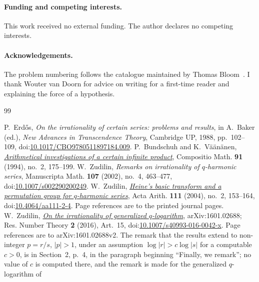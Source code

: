 \documentclass[11pt]{article}
\begin{document}
\paragraph{Funding and competing interests.}
This work received no external funding. The author declares no
competing interests.

\paragraph{Acknowledgements.}
The problem numbering follows the catalogue maintained by Thomas
Bloom~\cite{erdosproblems}. I thank Wouter van Doorn for advice on
writing for a first-time reader and explaining the force of a
hypothesis.

\begin{thebibliography}{99}
\small
\raggedright
\setlength{\itemsep}{2pt}
 P.~Erd\H{o}s, \emph{On the irrationality of certain series:
  problems and results}, in A.~Baker (ed.), \emph{New Advances in Transcendence
  Theory}, Cambridge UP, 1988, pp.~102--109,
  doi:\href{https://doi.org/10.1017/CBO9780511897184.009}{10.1017/CBO9780511897184.009}.
 P.~Bundschuh and K.~V\"a\"an\"anen,
  \href{https://numdam.org/item/CM_1994__91_2_175_0.pdf}{\emph{Arithmetical
  investigations of a certain infinite product}},
  Compositio Math. \textbf{91} (1994), no.~2, 175--199.
 W.~Zudilin, \emph{Remarks on irrationality of
  \(q\)-harmonic series}, Manuscripta Math. \textbf{107} (2002), no.~4,
  463--477,
  doi:\href{https://doi.org/10.1007/s002290200249}{10.1007/s002290200249}.
 W.~Zudilin,
  \href{https://geodesic.mathdoc.fr/articles/10.4064/aa111-2-4/}{\emph{Heine's
  basic transform and a permutation group for \(q\)-harmonic series}},
  Acta Arith. \textbf{111} (2004), no.~2, 153--164,
  doi:\href{https://doi.org/10.4064/aa111-2-4}{10.4064/aa111-2-4}.
  Page references are to the printed journal pages.
 W.~Zudilin,
  \href{https://arxiv.org/abs/1601.02688v2}{\emph{On the irrationality of
  generalized \(q\)-logarithm}}, arXiv:1601.02688; Res. Number Theory
  \textbf{2} (2016), Art.~15,
  doi:\href{https://doi.org/10.1007/s40993-016-0042-x}{10.1007/s40993-016-0042-x}.
  Page references are to arXiv:1601.02688v2.
  The remark that the results extend to non-integer \(p=r/s\), \(|p|>1\), under
  an assumption \(\log|r|>c\log|s|\) for a computable \(c>0\), is in Section~2,
  p.~4, in the paragraph beginning ``Finally, we remark''; no value of \(c\) is
  computed there, and the remark is made for the generalized \(q\)-logarithm of

\end{thebibliography}
\end{document}
